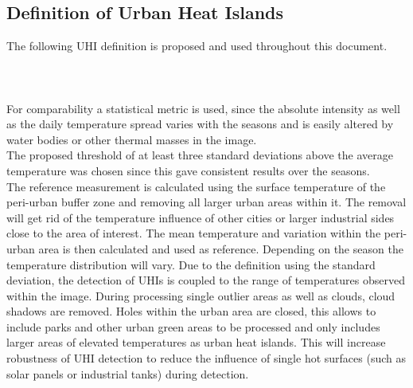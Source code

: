 \documentclass[12pt,a4paper, english,twoside]{scrartcl}
\begin{document}
    \subsection{Definition of Urban Heat Islands}\label{ssec:definition}
      The following \gls{UHI} definition is proposed and used throughout this document.\\
      \\
      \noindent{}\\ \\
      For comparability a statistical metric is used, since the absolute intensity as well as the daily temperature spread varies with the seasons and is easily altered by water bodies or other thermal masses in the image.\\ 
      The proposed threshold of at least three standard deviations above the average temperature was chosen since this gave consistent results over the seasons. \\
      The reference measurement is calculated using the surface temperature of the peri-urban buffer zone and removing all larger urban areas within it. 
      The removal will get rid of the temperature influence of other cities or larger industrial sides close to the area of interest.
      The mean temperature and variation within the peri-urban area is then calculated and used as reference.
      Depending on the season the temperature distribution will vary.
      Due to the definition using the standard deviation, the detection of \glspl{UHI} is coupled to the range of temperatures observed within the image. 
      During processing single outlier areas as well as clouds, cloud shadows are removed.
      Holes within the urban area are closed, this allows to include parks and other urban green areas to be processed and only includes larger areas of elevated temperatures as urban heat islands. 
      This will increase robustness of \gls{UHI} detection to reduce the influence of single hot surfaces (such as solar panels or industrial tanks) during detection.
\end{document}
